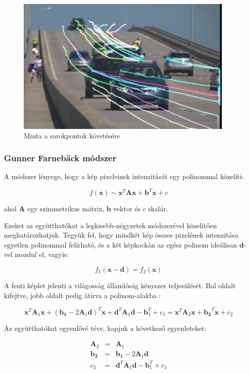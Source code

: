 \begin{figure}[tbh]
\centering
\includegraphics[width=300pt]{figures/opticalflow_lk.jpg}
\caption{Minta a sarokpontok követésére \cite{opencv-lk} \label{fig:lk}}
\end{figure}

\subsubsection{Gunner Farnebäck módszer \cite{farneback}}

A módszer lényege, hogy a kép pixeleinek intenzitását egy polinommal közelíti:

\[f(\mathbf{x}) \sim \mathbf{x}^T \mathbf{A} \mathbf{x} + \mathbf{b}^T \mathbf{x} + c\]

ahol $\mathbf{A}$ egy szimmetrikus mátrix, $\mathbf{b}$ vektor és $c$ skalár.

Ezeket az együtthatókat a legkisebb-négyzetek módszerével közelítően meghatározhatjuk. Tegyük fel, hogy mindkét kép összes pixelének intenzitása egyetlen polinommal felírható, és a két képkockán az egész polinom ideálisan $\mathbf{d}$-vel mozdul el, vagyis:

\[f_1(\mathbf{x} - \mathbf{d}) = f_2(\mathbf{x})\]

A fenti képlet jelenti a világosság állandóság kényszer teljesülését. Bal oldalt kifejtve, jobb oldalt pedig átírva a polinom-alakba \cite{farneback}:

\[\mathbf{x}^T \mathbf{A}_1 \mathbf{x} + (\mathbf{b_1} - 2 \mathbf{A}_1\mathbf{d})^T \mathbf{x} + \mathbf{d}^T \mathbf{A}_1 \mathbf{d} -\mathbf{b}_1^T + c_1 = \mathbf{x}^T \mathbf{A}_2 \mathbf{x} + \mathbf{b_2}^T \mathbf{x} + c_2\]

Az együtthatókat egyenlővé téve, kapjuk a következő egyenleteket:

\[\begin{array}{rcl}\mathbf{A}_2 &=& \mathbf{A}_1\\\mathbf{b_2} &=& \mathbf{b_1} - 2 \mathbf{A}_1\mathbf{d}\\ c_2 &=& \mathbf{d}^T \mathbf{A}_1 \mathbf{d} -\mathbf{b}_1^T + c_1 \end{array}\]

